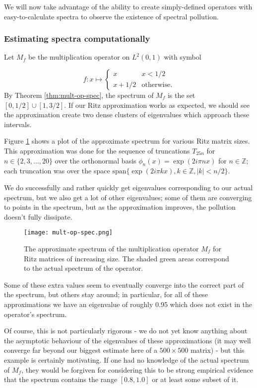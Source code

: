 \documentclass[../main.tex]{subfiles}
\begin{document}
We will now take advantage of the ability to create simply-defined operators with easy-to-calculate
spectra to observe the existence of spectral pollution.

\subsubsection{Estimating spectra computationally}
\begin{example}
Let $M_f$ be the multiplication operator on $L^2(0, 1)$ with symbol

$$
f: x \mapsto \begin{cases}
x & x < 1/2 \\
x + 1/2 & \text{otherwise.}
\end{cases}
$$
By Theorem \ref{thm:mult-op-spec}, the spectrum of $M_f$ is the set $[0, 1/2] \cup [1, 3/2]$. If our Ritz approximation works as expected, we should
see the approximation create two dense clusters of eigenvalues which approach these intervals.
\end{example}

Figure \ref{fig:mult-op-spec} shows a plot of the approximate spectrum for various Ritz matrix sizes. This approximation was done for the sequence of
truncations $T_{25n}$ for $n \in \{2, 3, ..., 20\}$ over the orthonormal basis $\phi_n(x) = \exp(2 i \pi n x)$ for $n \in \mathbb{Z}$; each truncation was
over the space $\mathrm{span}\{\exp(2 i \pi k x), k \in \mathbb{Z}, |k| < n/2\}$.

We do successfully and rather quickly get eigenvalues corresponding to our actual spectrum, but we also get a lot of other eigenvalues; some of them are 
converging to points in the spectrum, but as the approximation improves, the pollution doesn't fully dissipate.

\begin{figure}[h]
\centering
\texttt{[image: mult-op-spec.png]}
\caption{The approximate spectrum of the multiplication operator $M_f$ for Ritz matrices of increasing size. The shaded green areas correspond to the 
actual spectrum of the operator.}\label{fig:mult-op-spec}
\end{figure}

Some of these extra values seem to eventually converge into the correct part of the spectrum, but others stay around; in particular, for all of these approximations we have an eigenvalue of roughly 0.95 which does not exist in the operator's spectrum.

Of course, this is not particularly rigorous - we do not yet know anything about the asymptotic behaviour of the eigenvalues of these approximations (it may well converge far beyond our biggest estimate here of a $500 \times 500$ matrix) - but this example is certainly motivating. If one had no knowledge of the actual spectrum of $M_f$, they would be forgiven for considering this to be strong empirical evidence that the spectrum contains the range $[0.8, 1.0]$ or at least some subset of it. 
\end{document}
